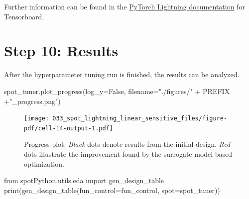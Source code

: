 \documentclass[
  letterpaper,
  DIV=11,
  numbers=noendperiod]{scrreprt}
\newenvironment{Shaded}{\begin{snugshade}}{\end{snugshade}}
\newcommand{\BuiltInTok}[1]{\textcolor[rgb]{0.00,0.23,0.31}{#1}}
\newcommand{\ImportTok}[1]{\textcolor[rgb]{0.00,0.46,0.62}{#1}}
\newcommand{\NormalTok}[1]{\textcolor[rgb]{0.00,0.23,0.31}{#1}}
\newcommand{\OperatorTok}[1]{\textcolor[rgb]{0.37,0.37,0.37}{#1}}
\newcommand{\StringTok}[1]{\textcolor[rgb]{0.13,0.47,0.30}{#1}}
\newcommand{\VariableTok}[1]{\textcolor[rgb]{0.07,0.07,0.07}{#1}}
\begin{document}
Further information can be found in the
\href{https://lightning.ai/docs/pytorch/stable/api/lightning.pytorch.loggers.tensorboard.html}{PyTorch
Lightning documentation} for Tensorboard.

\section{Step 10: Results}\label{sec-results-31}

After the hyperparameter tuning run is finished, the results can be
analyzed.

\begin{Shaded}
\begin{Highlighting}[]
\NormalTok{spot\_tuner.plot\_progress(log\_y}\OperatorTok{=}\VariableTok{False}\NormalTok{,}
\NormalTok{    filename}\OperatorTok{=}\StringTok{"./figures/"} \OperatorTok{+}\NormalTok{ PREFIX }\OperatorTok{+}\StringTok{"\_progress.png"}\NormalTok{)}
\end{Highlighting}
\end{Shaded}

\begin{figure}[H]

{\centering \texttt{[image: 033\_spot\_lightning\_linear\_sensitive\_files/figure-pdf/cell-14-output-1.pdf]}

}

\caption{Progress plot. \emph{Black} dots denote results from the
initial design. \emph{Red} dots illustrate the improvement found by the
surrogate model based optimization.}

\end{figure}%

\begin{Shaded}
\begin{Highlighting}[]
\ImportTok{from}\NormalTok{ spotPython.utils.eda }\ImportTok{import}\NormalTok{ gen\_design\_table}
\BuiltInTok{print}\NormalTok{(gen\_design\_table(fun\_control}\OperatorTok{=}\NormalTok{fun\_control, spot}\OperatorTok{=}\NormalTok{spot\_tuner))}
\end{Highlighting}
\end{Shaded}
\end{document}
